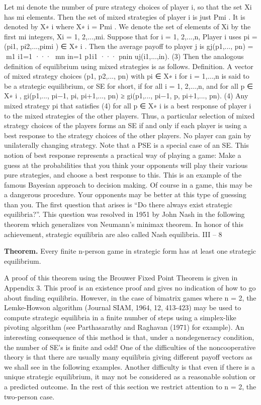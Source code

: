 \documentclass{article}
\begin{document}
Let mi denote the number of pure strategy choices of player i, so that the set Xi has mi
elements. Then the set of mixed strategies of player i is just Pmi . It is denoted by X∗
i
where X∗
i = Pmi .
We denote the set of elements of Xi by the first mi integers, Xi = {1, 2,...,mi}.
Suppose that for i = 1, 2,...,n, Player i uses pi = (pi1, pi2,...,pimi ) ∈ X∗
i . Then the
average payoff to player j is
gj(p1,..., pn) = m1
i1=1
··· mn
in=1
p1i1 ··· pnin uj(i1,...,in). (3)
Then the analogous definition of equilibrium using mixed strategies is as follows.
Definition. A vector of mixed strategy choices (p1, p2,..., pn) with pi ∈ X∗
i for i =
1,...,n is said to be a strategic equilibrium, or SE for short, if for all i = 1, 2,...,n, and
for all p ∈ X∗
i ,
gi(p1,..., pi−1, pi, pi+1,..., pn) ≥ gi(p1,..., pi−1, p, pi+1,..., pn). (4)
Any mixed strategy pi that satisfies (4) for all p ∈ X∗
i is a best response of player i
to the mixed strategies of the other players. Thus, a particular selection of mixed strategy
choices of the players forms an SE if and only if each player is using a best response to the
strategy choices of the other players. No player can gain by unilaterally changing strategy.
Note that a PSE is a special case of an SE.
This notion of best response represents a practical way of playing a game: Make
a guess at the probabilities that you think your opponents will play their various pure
strategies, and choose a best response to this. This is an example of the famous Bayesian
approach to decision making. Of course in a game, this may be a dangerous procedure.
Your opponents may be better at this type of guessing than you.
The first question that arises is “Do there always exist strategic equilibria?”. This
question was resolved in 1951 by John Nash in the following theorem which generalizes
von Neumann’s minimax theorem. In honor of this achievement, strategic equilibria are
also called Nash equilibria.
III – 8


\begin{framed}
\noindent \textbf{Theorem.} Every finite n-person game in strategic form has at least one strategic equilibrium.
\end{framed}
A proof of this theorem using the Brouwer Fixed Point Theorem is given in Appendix
3. This proof is an existence proof and gives no indication of how to go about finding
equilibria. However, in the case of bimatrix games where n = 2, the Lemke-Howson
algorithm (Journal SIAM, 1964, 12, 413-423) may be used to compute strategic equilibria
in a finite number of steps using a simplex-like pivoting algorithm (see Parthasarathy and
Raghavan (1971) for example). An interesting consequence of this method is that, under
a nondegeneracy condition, the number of SE’s is finite and odd!
One of the difficulties of the noncooperative theory is that there are usually many
equilibria giving different payoff vectors as we shall see in the following examples. Another
difficulty is that even if there is a unique strategic equilibrium, it may not be considered
as a reasonable solution or a predicted outcome. In the rest of this section we restrict
attention to n = 2, the two-person case.
\end{document}
